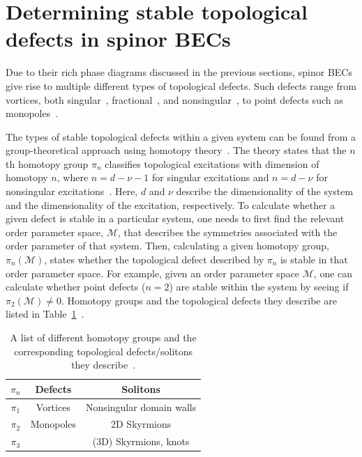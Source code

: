 \section{Determining stable topological defects in spinor BECs}
Due to their rich phase diagrams discussed in the previous sections, spinor BECs
give rise to multiple different types of topological defects.
Such defects range from vortices, both singular~\cite{Yip1999,Isoshima2002,
Mizushima2002, Sadler2006,Semenoff2007,Lovegrove2012,Lovegrove2016,
Borgh2016,Weiss2019,Xiao2021,Xiao2022}, fractional~\cite{Leonhardt2000,
Zhou2003,Ji2008,Seo2015,Semenoff2007,Kobayashi2009,Lovegrove2012,
Lovegrove2016,Borgh2016,Borgh2017,Xiao2021,Xiao2022}, and
nonsingular~\cite{Ohmi1998, Ho1998, Mizushima2002a,
Martikainen2002, Leanhardt2003, Mizushima2004, Choi2012, Choi2012a,
Lovegrove2014,Weiss2019}, to point defects such as monopoles~\cite{Stoof2001,
Savage2003,Ruostekoski2003, Pietila2009,Ray2014,Ray2015,Ollikainen2017,
Mithun2022}.

The types of stable topological defects within a given system can be
found from a group-theoretical approach using homotopy theory~\cite{Mermin1979,
Kawaguchi2012}.
The theory states that the \(n\)th homotopy group \(\pi_n\) classifies
topological excitations with dimension of homotopy \(n\), where
\(n = d - \nu - 1\) for singular excitations and \(n=d - \nu \) for nonsingular
excitations~\cite{Kobayashi2012}.
Here, \(d\) and \(\nu \) describe the dimensionality of the system and the
dimensionality of the excitation, respectively.
To calculate whether a given defect is stable in a particular system, one needs
to first find the relevant order parameter space, \(\mathcal{M}\), that
describes the symmetries associated with the order parameter of that system.
Then, calculating a given homotopy group, \(\pi_n(\mathcal{M})\), states whether
the topological defect described by \(\pi_n\) is stable in that order parameter
space.
For example, given an order parameter space \(\mathcal{M}\), one can calculate
whether point defects (\(n=2\)) are stable within the system by seeing if
\(\pi_2(\mathcal{M}) \neq 0\).
Homotopy groups and the topological defects they describe are listed in
Table~\ref{tab: homotopy-groups}~\cite{Kawaguchi2012}.
\begin{table}
    \centering
    \begin{tabular}{ccc}
        \toprule
        \(\pi_n\) & Defects & Solitons \\
        \midrule
        \(\pi_1 \) & Vortices & Nonsingular domain walls \\
        \(\pi_2 \) & Monopoles & 2D Skyrmions \\
        \(\pi_3 \) &  & (3D) Skyrmions, knots \\
        \bottomrule
    \end{tabular}
    \caption{\label{tab: homotopy-groups}A list of different homotopy groups
    and the corresponding topological defects/solitons they
    describe~\cite{Kawaguchi2012}.}
\end{table}

